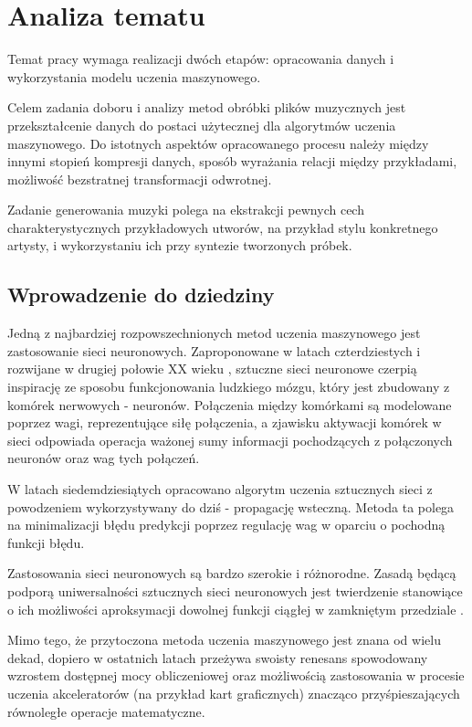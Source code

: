 \chapter{Analiza tematu}
{
  Temat pracy wymaga realizacji dwóch etapów: opracowania danych i wykorzystania modelu
  uczenia maszynowego.

  Celem zadania doboru i analizy metod obróbki plików muzycznych jest 
  przekształcenie danych do postaci użytecznej dla algorytmów uczenia maszynowego.
  Do istotnych aspektów opracowanego procesu należy między innymi stopień kompresji danych,
  sposób wyrażania relacji między przykładami, możliwość bezstratnej transformacji odwrotnej. 

  Zadanie generowania muzyki polega na ekstrakcji pewnych cech charakterystycznych
  przykładowych utworów, na przykład stylu konkretnego artysty, 
  i wykorzystaniu ich przy syntezie tworzonych próbek. 

  \section{Wprowadzenie do dziedziny}
  {
    Jedną z najbardziej rozpowszechnionych metod uczenia maszynowego jest zastosowanie sieci neuronowych.
    Zaproponowane w latach czterdziestych i rozwijane w drugiej połowie XX wieku \cite{McCulloch1943}, sztuczne sieci neuronowe
    czerpią inspirację ze sposobu funkcjonowania ludzkiego mózgu, który jest zbudowany z komórek nerwowych - neuronów.
    Połączenia między komórkami są modelowane poprzez wagi, reprezentujące siłę połączenia, a zjawisku aktywacji
    komórek w sieci odpowiada operacja ważonej sumy informacji pochodzących z połączonych neuronów oraz wag tych połączeń.
    
    W latach siedemdziesiątych opracowano algorytm uczenia sztucznych sieci z powodzeniem wykorzystywany
    do dziś - propagację wsteczną. Metoda ta polega na minimalizacji błędu predykcji poprzez regulację
    wag w oparciu o pochodną funkcji błędu.

    Zastosowania sieci neuronowych są bardzo szerokie i różnorodne. Zasadą będącą podporą uniwersalności 
    sztucznych sieci neuronowych jest twierdzenie stanowiące o ich możliwości aproksymacji dowolnej 
    funkcji ciągłej w zamkniętym przedziale \cite{Csji2001ApproximationWA}.

    Mimo tego, że przytoczona metoda uczenia maszynowego jest znana od wielu dekad, dopiero w ostatnich latach
    przeżywa swoisty renesans spowodowany wzrostem dostępnej mocy obliczeniowej oraz 
    możliwością zastosowania w procesie uczenia akceleratorów (na przykład kart graficznych) znacząco 
    przyśpieszających równoległe operacje matematyczne.


}}
